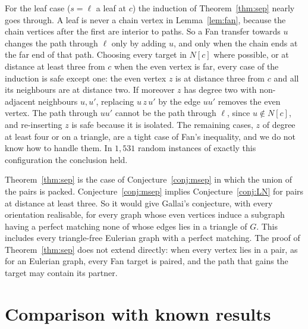 \documentclass[11pt]{amsart}
\theoremstyle{definition}
\begin{document}
For the leaf case ($s=\ell$ a leaf at $c$) the induction of Theorem~\ref{thm:sep} nearly goes through.
A leaf is never a chain vertex in Lemma~\ref{lem:fan}, because the chain vertices after the first are
interior to paths. So a Fan transfer towards $u$ changes the path through $\ell$ only by adding $u$, and
only when the chain ends at the far end of that path. Choosing every target in $N[c]$ where possible, or
at distance at least three from $c$ when the even vertex is far, every case of the induction is safe
except one: the even vertex $z$ is at distance three from $c$ and all its neighbours are at distance
two. If moreover $z$ has degree two with non-adjacent neighbours $u,u'$, replacing $u\,z\,u'$ by the edge
$uu'$ removes the even vertex. The path through $uu'$ cannot be the path through $\ell$, since $u\notin
N[c]$, and re-inserting $z$ is safe because it is isolated. The remaining cases, $z$ of degree at least
four or on a triangle, are a tight case of Fan's inequality, and we do not know how to handle them.
In $1{,}531$ random instances of exactly this configuration the conclusion held.

Theorem~\ref{thm:sep} is the case of Conjecture~\ref{conj:msep} in which the union of the pairs is
packed. Conjecture~\ref{conj:msep} implies Conjecture~\ref{conj:LN} for pairs at distance at least three. So it
would give Gallai's conjecture, with every orientation realisable, for every graph whose even vertices
induce a subgraph having a perfect matching none of whose edges lies in a triangle of $G$. This includes
every triangle-free Eulerian graph with a perfect matching. The proof of Theorem~\ref{thm:sep} does not
extend directly: when every vertex lies in a pair, as for an Eulerian graph, every Fan target is
paired, and the path that gains the target may contain its partner.

\section{Comparison with known results}\label{sec:compare}
\end{document}
